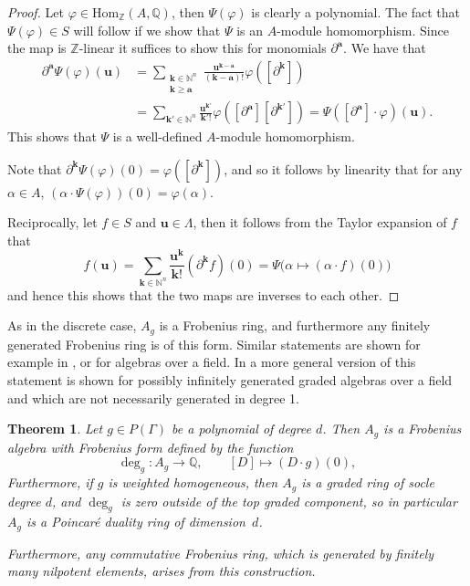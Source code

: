 \documentclass[oneside]{amsart}
\theoremstyle{plain}
\newtheorem{theorem}{Theorem}[section]
\theoremstyle{definition}
\newcommand{\Z}{{\mathbb{Z}}}
\newcommand{\N}{{\mathbb{N}}}
\newcommand{\Q}{{\mathbb{Q}}}
\newcommand{\Hom}{{\mathrm{Hom}}}
\renewcommand{\vec}[1]{\ensuremath{\mathbf{#1}}}
\begin{document}
\begin{proof}
    Let $\varphi \in \Hom_\Z(A, \Q)$, then $\Psi(\varphi)$ is clearly a polynomial. The fact that $\Psi(\varphi) \in S$ will follow if we show that $\Psi$ is an $A$-module homomorphism. Since the map is $\Z$-linear it suffices to show this for monomials $\partial^\mathbf{a}$.
    We have that
    \begin{align*}
        \partial^\mathbf{a} \Psi(\varphi)(\mathbf{u}) &=
        \sum_{\substack{\mathbf{k} \in \N^n\\\mathbf{k} \geq \mathbf{a}}}
        \frac{\mathbf{u}^{\mathbf{k} - \mathbf{a}}}{(\mathbf{k} - \mathbf{a})!} \varphi([\partial^{\mathbf{k}}])\\
        &= \sum_{\mathbf{k'} \in \N^n }
        \frac{\mathbf{u}^{\mathbf{k'}}}{\mathbf{k'}!} \varphi([\partial^\mathbf{a}][\partial^{\mathbf{k'}}])
        = \Psi([\partial^\mathbf{a}] \cdot \varphi)(\mathbf{u}).
    \end{align*}
    This shows that $\Psi$ is a well-defined $A$-module homomorphism.
    
    Note that $\partial^\mathbf{k} \Psi(\varphi)(0) = \varphi([\partial^\mathbf{k}])$, and so it follows by linearity that for any $\alpha \in A$, $(\alpha \cdot \Psi(\varphi))(0) = \varphi(\alpha)$.
    
    Reciprocally, let $f \in S$ and $\vec u \in \Lambda$, then it follows from the Taylor expansion of $f$ that
    \[
        f(\vec u) = \sum_{\mathbf{k} \in \N^n} \frac{\mathbf{u}^\mathbf{k}}{\mathbf{k}!} (\partial^{\mathbf{k}}f)(0)
        = \Psi\big(\alpha \mapsto (\alpha \cdot f)(0)\big)
    \]
    and hence this shows that the two maps are inverses to each other.
\end{proof}

As in the discrete case, $A_g$ is a Frobenius ring, and furthermore any finitely generated Frobenius ring is of this form.
Similar statements are shown for example in
\cite{iarrobino1999}, \cite[Ex. 21.7]{Eis} or \cite[Theorem 1.1]{Kaveh11} for algebras over a field.
In \cite[Theorem 4.8]{khovanskii2021gorenstein} a more general version of this statement is shown for possibly infinitely generated graded algebras over a field and which are not necessarily generated in degree 1.

\begin{theorem}\label{thm:diffalg}
Let $g\in P(\Gamma)$ be a polynomial of degree $d$.
Then $A_g$ is a Frobenius algebra with Frobenius form defined by the function 
\[\deg_g: A_g \to \Q, \qquad [D] \mapsto (D \cdot  g)(0),\]
Furthermore, if $g$ is weighted homogeneous, then $A_g$ is a graded ring of socle degree $d$, and $\deg_g$ is zero outside of the top graded component, so in particular $A_g$ is a
Poincar\'e duality ring  of dimension~$d$.

Furthermore, any commutative Frobenius ring, which is generated by finitely many nilpotent elements, arises from this construction. 
\end{theorem}
\end{document}
